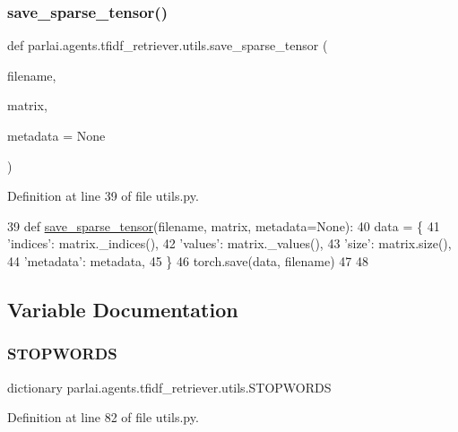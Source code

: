 \subsubsection{\texorpdfstring{save\+\_\+sparse\+\_\+tensor()}{save\_sparse\_tensor()}}
{\footnotesize\ttfamily def parlai.\+agents.\+tfidf\+\_\+retriever.\+utils.\+save\+\_\+sparse\+\_\+tensor (\begin{DoxyParamCaption}\item[{}]{filename,  }\item[{}]{matrix,  }\item[{}]{metadata = {\ttfamily None} }\end{DoxyParamCaption})}



Definition at line 39 of file utils.\+py.


\begin{DoxyCode}
39 \textcolor{keyword}{def }\hyperlink{namespaceparlai_1_1agents_1_1tfidf__retriever_1_1utils_a6d1c2b31f2a5d432d7cb677f436e17c0}{save\_sparse\_tensor}(filename, matrix, metadata=None):
40     data = \{
41         \textcolor{stringliteral}{'indices'}: matrix.\_indices(),
42         \textcolor{stringliteral}{'values'}: matrix.\_values(),
43         \textcolor{stringliteral}{'size'}: matrix.size(),
44         \textcolor{stringliteral}{'metadata'}: metadata,
45     \}
46     torch.save(data, filename)
47 
48 
\end{DoxyCode}


\subsection{Variable Documentation}
\mbox{\label{namespaceparlai_1_1agents_1_1tfidf__retriever_1_1utils_afd1296771f9d4fe64b901825a37b1438}} 
\subsubsection{\texorpdfstring{S\+T\+O\+P\+W\+O\+R\+DS}{STOPWORDS}}
{\footnotesize\ttfamily dictionary parlai.\+agents.\+tfidf\+\_\+retriever.\+utils.\+S\+T\+O\+P\+W\+O\+R\+DS}



Definition at line 82 of file utils.\+py.

